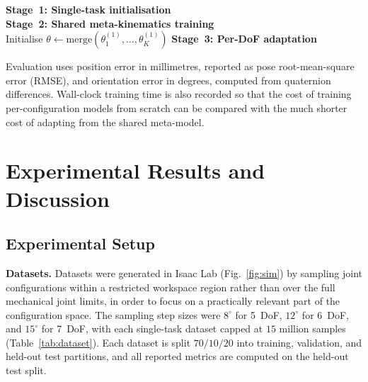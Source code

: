 \documentclass[conference]{IEEEtran}
\begin{document}
\begin{algorithm}[!t]
\caption{Meta-Kinematics Training and Adaptation}
\label{alg:metakin}
\BlankLine
\textbf{Stage~1: Single-task initialisation}\\
\textbf{Stage~2: Shared meta-kinematics training}\\
Initialise $\theta \leftarrow \mathrm{merge}(\theta_1^{(1)}, \dots, \theta_K^{(1)})$\;
\textbf{Stage~3: Per-DoF adaptation}\\
\end{algorithm}

Evaluation uses position error in millimetres, reported as pose root-mean-square error (RMSE), and orientation error in degrees, computed from quaternion differences. Wall-clock training time is also recorded so that the cost of training per-configuration models from scratch can be compared with the much shorter cost of adapting from the shared meta-model.

\section{Experimental Results and Discussion}
\label{sec:exp}

\subsection{Experimental Setup}
\label{sec:setup}

\textbf{Datasets.}
Datasets were generated in Isaac Lab (Fig.~\ref{fig:sim}) by sampling joint configurations within a restricted workspace region rather than over the full mechanical joint limits, in order to focus on a practically relevant part of the configuration space. The sampling step sizes were $8^\circ$ for 5~DoF, $12^\circ$ for 6~DoF, and $15^\circ$ for 7~DoF, with each single-task dataset capped at $15$ million samples (Table~\ref{tab:dataset}). Each dataset is split $70/10/20$ into training, validation, and held-out test partitions, and all reported metrics are computed on the held-out test split.
\end{document}
